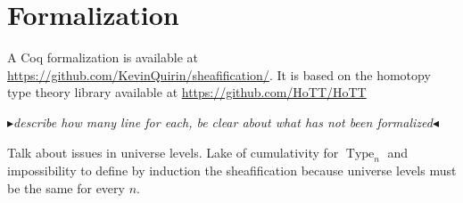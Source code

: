 \documentclass[conference]{IEEEtran}
\newcommand{\mynote}[2]{
    \fbox{\bfseries\sffamily\scriptsize#1}
    {\small$\blacktriangleright$\textsf{\emph{#2}}$\blacktriangleleft$}~}
\newcommand\nt[1]{\mynote{NT}{#1}}
\DeclareMathOperator{\Type}{Type}
\begin{document}
%



\section{Formalization} 
\label{sec:formalization}

A Coq formalization is available at
\url{https://github.com/KevinQuirin/sheafification/}.
%
It is based on the homotopy type theory library available at
\url{https://github.com/HoTT/HoTT}

\nt{describe how many line for each, be clear about what has not been formalized}

Talk about issues in universe levels. Lake of cumulativity for
$\Type_n$ and impossibility to define by induction the sheafification 
because universe levels must be the same for every $n$.
\end{document}

